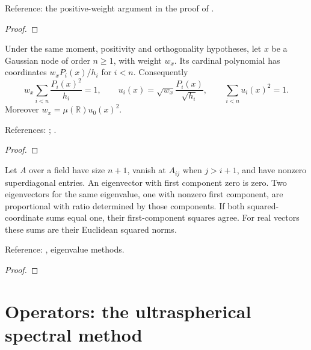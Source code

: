\begin{supporting}
\begin{theorem}
Reference: the positive-weight argument in the proof of \cite[Theorem 19.3]{atap}.
\end{theorem}
\begin{proof}
\leanok
\end{proof}

\begin{theorem}
\label{thm:gauss-evaluation-vector}
\leanok
Under the same moment, positivity and orthogonality hypotheses, let $x$ be a
Gaussian node of order $n\ge1$, with weight $w_x$. Its cardinal polynomial
has coordinates $w_xP_i(x)/h_i$ for $i<n$. Consequently
\[
 w_x\sum_{i<n}\frac{P_i(x)^2}{h_i}=1,\qquad
 u_i(x)=\sqrt{w_x}\frac{P_i(x)}{\sqrt{h_i}},\qquad
 \sum_{i<n}u_i(x)^2=1.
\]
Moreover $w_x=\mu(\mathbb R)u_0(x)^2$.

References: \cite[3.5(vi)]{dlmf}; \cite{golub-welsch}.
\end{theorem}
\begin{proof}
\leanok
\end{proof}

\begin{theorem}
\label{thm:hessenberg-eigenvector}
\leanok
Let $A$ over a field have size $n+1$, vanish at $A_{ij}$ when $j>i+1$, and
have nonzero superdiagonal entries. An eigenvector with first component zero
is zero. Two eigenvectors for the same eigenvalue, one with nonzero first
component, are proportional with ratio determined by those components.
If both squared-coordinate sums equal one, their first-component squares agree.
For real vectors these sums are their Euclidean squared norms.

Reference: \cite{golub-van-loan}, eigenvalue methods.
\end{theorem}
\begin{proof}
\leanok
\end{proof}

\end{supporting}

\part{Operators: the ultraspherical spectral method}\label{part:operators}

